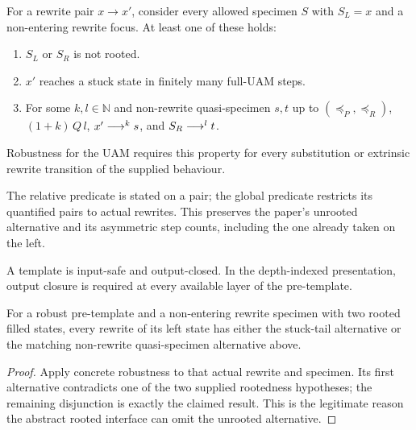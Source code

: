 \begin{definition}
For a rewrite pair $x\to x'$, consider every allowed specimen $S$ with
$S_L=x$ and a non-entering rewrite focus. At least one of these holds:
\begin{enumerate}
\item $S_L$ or $S_R$ is not rooted.
\item $x'$ reaches a stuck state in finitely many full-UAM steps.
\item For some $k,l\in\mathbb N$ and non-rewrite quasi-specimen $s,t$ up to
$(\preceq_P,\preceq_R)$,
$(1+k)\,Q\,l$, $x'\mathrel{\longrightarrow^{k}}s$, and $S_R\mathrel{\longrightarrow^{l}}t$.
\end{enumerate}
Robustness for the UAM requires this property for every substitution or
extrinsic rewrite transition of the supplied behaviour.
\end{definition}
The relative predicate is stated on a pair; the global predicate restricts
its quantified pairs to actual rewrites. This preserves the paper's unrooted
alternative and its asymmetric step counts, including the one already taken
on the left.
\begin{definition}
A template is input-safe and output-closed. In the depth-indexed presentation,
output closure is required at every available layer of the pre-template.
\end{definition}

\begin{lemma}
For a robust pre-template and a non-entering rewrite specimen with two rooted
filled states, every rewrite of its left state has either the stuck-tail
alternative or the matching non-rewrite quasi-specimen alternative above.
\end{lemma}
\begin{proof}
Apply concrete robustness to that actual rewrite and specimen. Its first
alternative contradicts one of the two supplied rootedness hypotheses; the
remaining disjunction is exactly the claimed result. This is the legitimate
reason the abstract rooted interface can omit the unrooted alternative.
\end{proof}

